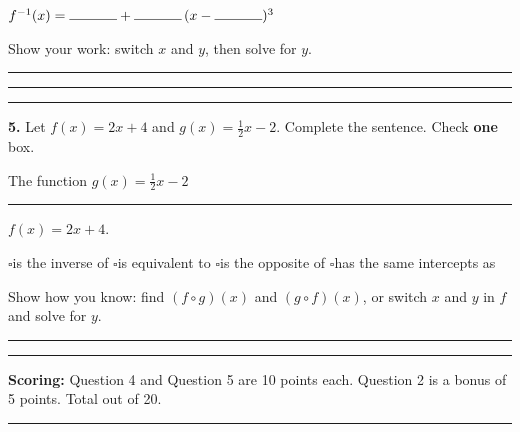 \documentclass[11pt]{article}
\newcommand{\checkbox}{$\square$\;}
\begin{document}
\vspace{8pt}
$f^{-1}(x)=\rule{1.2cm}{0.4pt}+\rule{1.2cm}{0.4pt}\,(x-\rule{1.2cm}{0.4pt})^3$

\vspace{8pt}
Show your work: switch $x$ and $y$, then solve for $y$.

\vspace{14pt}\rule{\linewidth}{0.4pt}

\vspace{14pt}\rule{\linewidth}{0.4pt}

\vspace{4pt}\noindent\rule{\textwidth}{0.4pt}

\vspace{6pt}
\textbf{5.} Let $f(x)=2x+4$ and $g(x)=\tfrac12x-2$. Complete the sentence. Check \textbf{one} box.

\vspace{4pt}
The function $g(x)=\tfrac12x-2$ \rule{4cm}{0.4pt} $f(x)=2x+4$.

\vspace{2pt}
\checkbox is the inverse of \qquad \checkbox is equivalent to \qquad \checkbox is the opposite of \qquad \checkbox has the same intercepts as

\vspace{8pt}
Show how you know: find $(f\circ g)(x)$ and $(g\circ f)(x)$, or switch $x$ and $y$ in $f$ and solve for $y$.

\vspace{14pt}\rule{\linewidth}{0.4pt}

\vspace{14pt}\rule{\linewidth}{0.4pt}

\vfill
\noindent\textbf{Scoring:} Question 4 and Question 5 are 10 points each. Question 2 is a bonus of 5 points. Total out of 20.

\newpage
{}

\vspace{4pt}\noindent\rule{\textwidth}{0.6pt}
\end{document}
